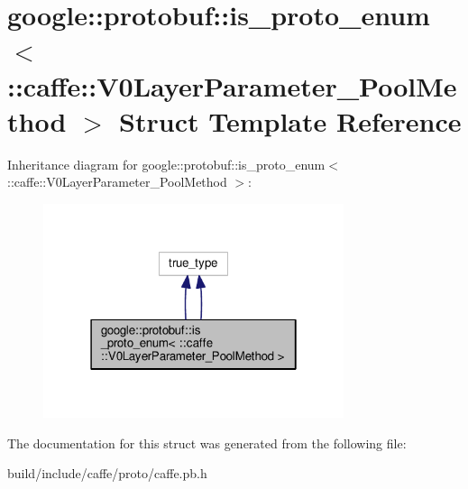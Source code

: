 \hypertarget{structgoogle_1_1protobuf_1_1is__proto__enum_3_01_1_1caffe_1_1_v0_layer_parameter___pool_method_01_4}{}\section{google\+:\+:protobuf\+:\+:is\+\_\+proto\+\_\+enum$<$ \+:\+:caffe\+:\+:V0\+Layer\+Parameter\+\_\+\+Pool\+Method $>$ Struct Template Reference}
\label{structgoogle_1_1protobuf_1_1is__proto__enum_3_01_1_1caffe_1_1_v0_layer_parameter___pool_method_01_4}


Inheritance diagram for google\+:\+:protobuf\+:\+:is\+\_\+proto\+\_\+enum$<$ \+:\+:caffe\+:\+:V0\+Layer\+Parameter\+\_\+\+Pool\+Method $>$\+:
\nopagebreak
\begin{figure}[H]
\begin{center}
\leavevmode
\includegraphics[width=250pt]{structgoogle_1_1protobuf_1_1is__proto__enum_3_01_1_1caffe_1_1_v0_layer_parameter___pool_method_01_4__inherit__graph}
\end{center}
\end{figure}


The documentation for this struct was generated from the following file\+:\begin{DoxyCompactItemize}
\item 
build/include/caffe/proto/caffe.\+pb.\+h\end{DoxyCompactItemize}
